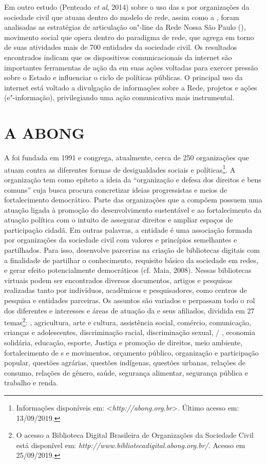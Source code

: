 Em outro estudo (Penteado \emph{et al}, 2014) sobre o uso das s por
organizações da sociedade civil que atuam dentro do modelo de rede,
assim como a , foram analisadas as estratégias de articulação
on"-line da Rede Nossa São Paulo (), movimento social que opera
dentro do paradigma de rede, que agrega em torno de suas atividades mais
de 700 entidades da sociedade civil. Os resultados encontrados indicam
que os dispositivos comunicacionais da internet são importantes
ferramentas de ação da  em suas ações voltadas para exercer pressão
sobre o Estado e influenciar o ciclo de políticas públicas. O principal
uso da internet está voltado a divulgação de informações sobre a Rede,
projetos e ações (e"-informação), privilegiando uma ação comunicativa
mais instrumental.

\section{A ABONG}

A  foi fundada em 1991 e congrega, atualmente, cerca de 250
organizações que atuam contra as diferentes formas de desigualdades
sociais e políticas\footnote{Informações disponíveis em:
  \textless{}\emph{http://abong.org.br}\textgreater{}.
  Último acesso em: 13/09/2019.}. A organização tem como epíteto a ideia
da ``organização e defesa dos direitos e bens comuns'' cuja busca procura
concretizar ideias progressistas e meios de fortalecimento democrático.
Parte das organizações que a compõem possuem uma atuação ligada à
promoção do desenvolvimento sustentável e ao fortalecimento da atuação
política com o intuito de assegurar direitos e ampliar espaços de
participação cidadã. Em outras palavras, a entidade é uma associação
formada por organizações da sociedade civil com valores e princípios
semelhantes e partilhados. Para isso, desenvolve parcerias na criação de
bibliotecas digitais com a finalidade de partilhar o conhecimento,
requisito básico da sociedade em redes, e gerar efeito potencialmente
democráticos (cf. Maia, 2008). Nessas bibliotecas virtuais podem ser
encontrados diversos documentos, artigos e pesquisas realizadas tanto
por indivíduos, acadêmicos e pesquisadores, como centros de pesquisa e
entidades parceiras. Os assuntos são variados e perpassam todo o rol dos
diferentes e interesses e áreas de atuação da  e seus afiliados,
dividida em 27 temas\footnote{O acesso a Biblioteca Digital Brasileira
  de Organizações da Sociedade Civil está disponível em:
  \emph{http://www.bibliotecadigital.abong.org.br/}.
  Acesso em 25/09/2019.}: , agricultura, arte e cultura,
assistência social, comércio, comunicação, crianças e adolescentes,
discriminação racial, discriminação sexual, / , economia
solidária, educação, esporte, Justiça e promoção de direitos, meio
ambiente, fortalecimento de s e movimentos, orçamento público,
organização e participação popular, questões agrárias, questões
indígenas, questões urbanas, relações de consumo, relações de gênero,
saúde, segurança alimentar, segurança pública e trabalho e renda.

